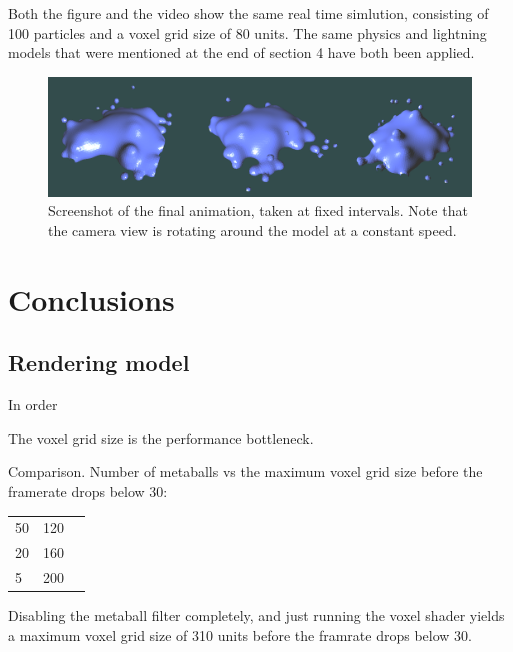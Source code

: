 \documentclass{article}
\begin{document}
\begin{multicols}{2}
        Both the figure and the video show the same real time simlution, consisting of 100 particles and a voxel grid size of 80 units.
        The same physics and lightning models that were mentioned at the end of section 4 have both been applied.

        \begin{figure}[H]
        	\begin{minipage}[b]{0.5\textwidth}
	            \includegraphics[width=\linewidth]{img/result-animation.png}
				\caption{Screenshot of the final animation, taken at fixed intervals. Note that the camera view is rotating around the model at a constant speed.}
				\label{fig:result-animation}
        	\end{minipage}
        \end{figure}

    \section{Conclusions}
    
        \subsection{Rendering model}
        

        In order 

        The voxel grid size is the performance bottleneck.

        Comparison.
        Number of metaballs vs the maximum voxel grid size before the framerate drops below 30:

        \begin{tabular}{ l | c | r }
          50 & 120 \\
          20 & 160 \\
          5 & 200 \\
        \end{tabular}

        Disabling the metaball filter completely, and just running the voxel shader yields a maximum voxel grid size of 310 units before the framrate drops below 30.


\end{multicols}
\end{document}
